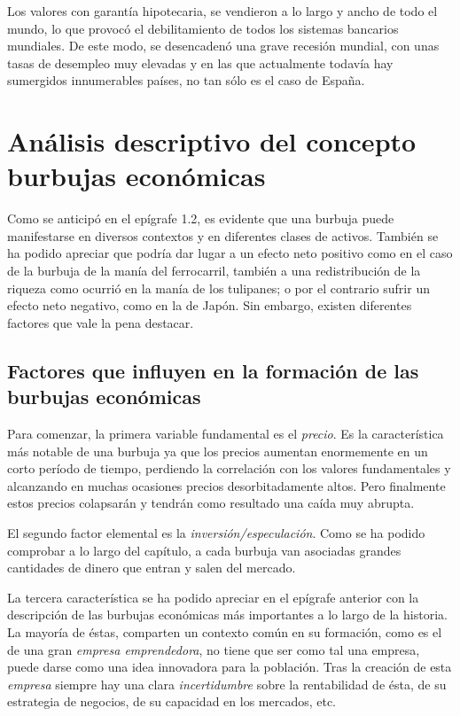 Los valores con garantía hipotecaria, se vendieron a lo largo y ancho de todo el mundo, lo que provocó el debilitamiento de todos los sistemas bancarios mundiales. De este modo, se desencadenó una grave recesión mundial, con unas tasas de desempleo muy elevadas y en las que actualmente todavía hay sumergidos innumerables países, no tan sólo es el caso de España.

\section{Análisis descriptivo del concepto burbujas económicas} 
Como se anticipó en el epígrafe 1.2, es evidente que una burbuja puede manifestarse en diversos contextos y en diferentes clases de activos. También se ha podido apreciar que podría dar lugar a un efecto neto positivo como en el caso de la burbuja de la manía del ferrocarril, también a una redistribución de la riqueza como ocurrió en la manía de los tulipanes; o por el contrario sufrir un efecto neto negativo, como en la de Japón. Sin embargo, existen diferentes factores que vale la pena destacar.

\subsection{Factores que influyen en la formación de las burbujas económicas} 

Para comenzar, la primera variable fundamental es el \emph{precio}. Es la característica más notable de una burbuja ya que los precios aumentan enormemente en un corto período de tiempo, perdiendo la correlación con los valores fundamentales y alcanzando en muchas ocasiones precios desorbitadamente altos. Pero finalmente estos precios colapsarán y tendrán como resultado una caída muy abrupta. 

El segundo factor elemental es la \emph{inversión/especulación}. Como se ha podido comprobar a lo largo del capítulo, a cada burbuja van asociadas grandes cantidades de dinero que entran y salen del mercado.

La tercera característica se ha podido apreciar en el epígrafe anterior con la descripción de las burbujas económicas más importantes a lo largo de la historia. La mayoría de éstas, comparten un contexto común en su formación, como es el de una gran \emph{empresa emprendedora}, no tiene que ser como tal una empresa, puede darse como una idea innovadora para la población. Tras la creación de esta \emph{empresa} siempre hay una clara \emph{incertidumbre} sobre la rentabilidad de ésta, de su estrategia de negocios, de su capacidad en los mercados, etc. 

